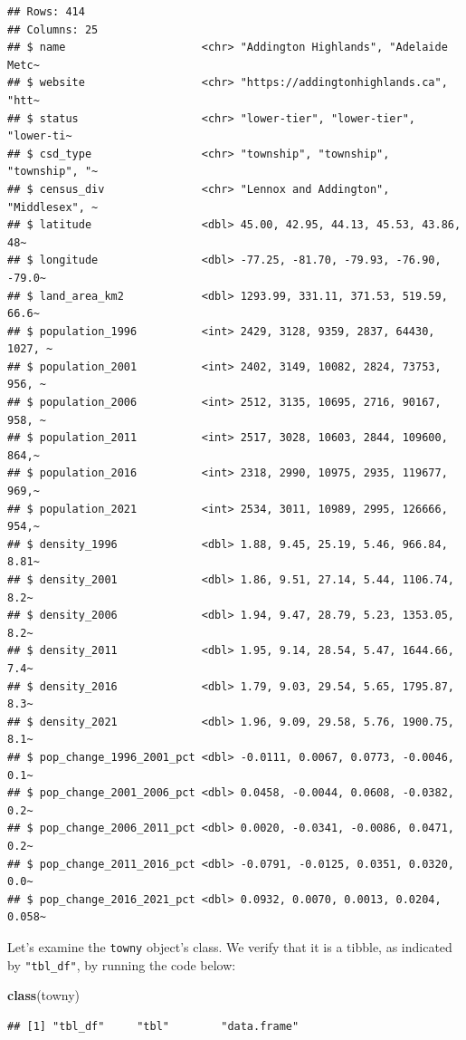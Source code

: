 \documentclass[
]{krantz}
\makeatletter
\newenvironment{Shaded}{\begin{snugshade}}{\end{snugshade}}
\newcommand{\FunctionTok}[1]{\textcolor[rgb]{0.27,0.27,0.27}{\textbf{#1}}}
\newcommand{\NormalTok}[1]{#1}
\newenvironment{kframe}{%
\medskip{}
\setlength{\fboxsep}{.8em}
 \def\at@end@of@kframe{}%
 \ifinner\ifhmode%
  \def\at@end@of@kframe{\end{minipage}}%
  \begin{minipage}{\columnwidth}%
 \fi\fi%
 \def\FrameCommand##1{\hskip\@totalleftmargin \hskip-\fboxsep
 \colorbox{shadecolor}{##1}\hskip-\fboxsep
     \hskip-\linewidth \hskip-\@totalleftmargin \hskip\columnwidth}%
 \MakeFramed {\advance\hsize-\width
   \@totalleftmargin\z@ \linewidth\hsize
   \@setminipage}}%
 {\par\unskip\endMakeFramed%
 \at@end@of@kframe}
\renewenvironment{Shaded}{\begin{kframe}}{\end{kframe}}
\makeatother
\begin{document}
\begin{verbatim}
## Rows: 414
## Columns: 25
## $ name                     <chr> "Addington Highlands", "Adelaide Metc~
## $ website                  <chr> "https://addingtonhighlands.ca", "htt~
## $ status                   <chr> "lower-tier", "lower-tier", "lower-ti~
## $ csd_type                 <chr> "township", "township", "township", "~
## $ census_div               <chr> "Lennox and Addington", "Middlesex", ~
## $ latitude                 <dbl> 45.00, 42.95, 44.13, 45.53, 43.86, 48~
## $ longitude                <dbl> -77.25, -81.70, -79.93, -76.90, -79.0~
## $ land_area_km2            <dbl> 1293.99, 331.11, 371.53, 519.59, 66.6~
## $ population_1996          <int> 2429, 3128, 9359, 2837, 64430, 1027, ~
## $ population_2001          <int> 2402, 3149, 10082, 2824, 73753, 956, ~
## $ population_2006          <int> 2512, 3135, 10695, 2716, 90167, 958, ~
## $ population_2011          <int> 2517, 3028, 10603, 2844, 109600, 864,~
## $ population_2016          <int> 2318, 2990, 10975, 2935, 119677, 969,~
## $ population_2021          <int> 2534, 3011, 10989, 2995, 126666, 954,~
## $ density_1996             <dbl> 1.88, 9.45, 25.19, 5.46, 966.84, 8.81~
## $ density_2001             <dbl> 1.86, 9.51, 27.14, 5.44, 1106.74, 8.2~
## $ density_2006             <dbl> 1.94, 9.47, 28.79, 5.23, 1353.05, 8.2~
## $ density_2011             <dbl> 1.95, 9.14, 28.54, 5.47, 1644.66, 7.4~
## $ density_2016             <dbl> 1.79, 9.03, 29.54, 5.65, 1795.87, 8.3~
## $ density_2021             <dbl> 1.96, 9.09, 29.58, 5.76, 1900.75, 8.1~
## $ pop_change_1996_2001_pct <dbl> -0.0111, 0.0067, 0.0773, -0.0046, 0.1~
## $ pop_change_2001_2006_pct <dbl> 0.0458, -0.0044, 0.0608, -0.0382, 0.2~
## $ pop_change_2006_2011_pct <dbl> 0.0020, -0.0341, -0.0086, 0.0471, 0.2~
## $ pop_change_2011_2016_pct <dbl> -0.0791, -0.0125, 0.0351, 0.0320, 0.0~
## $ pop_change_2016_2021_pct <dbl> 0.0932, 0.0070, 0.0013, 0.0204, 0.058~
\end{verbatim}

Let's examine the \texttt{towny} object's class. We verify that it is a tibble, as indicated by \texttt{"tbl\_df"}, by running the code below:

\begin{Shaded}
\begin{Highlighting}[]
\FunctionTok{class}\NormalTok{(towny)}
\end{Highlighting}
\end{Shaded}

\begin{verbatim}
## [1] "tbl_df"     "tbl"        "data.frame"
\end{verbatim}
\end{document}
